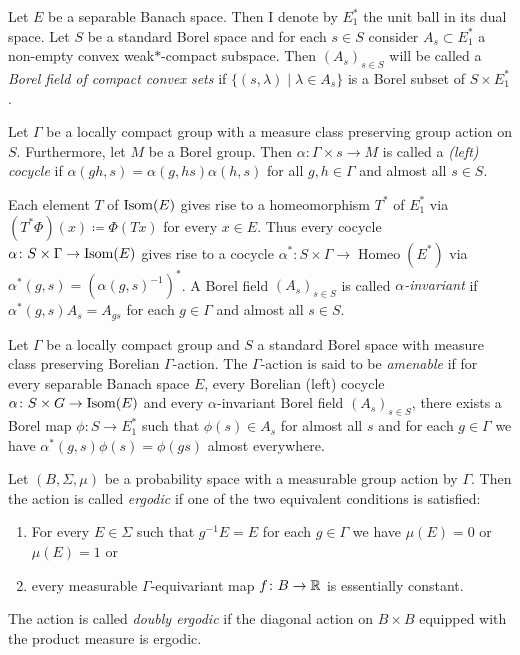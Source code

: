 \begin{defin}
  Let \(E\) be a separable Banach space. Then I denote by \(E^\ast_1\) the unit ball in its dual space. Let \(S\) be a standard Borel space and for each \(s \in S\) consider \(A_s \subset E^\ast_1\) a non-empty convex weak\(\ast\)-compact subspace. Then \((A_s)_{s \in S}\) will be called a \emph{Borel field of compact convex sets} if \(\{(s, \lambda) \mid \lambda \in A_s\}\) is a Borel subset of \(S \times E^\ast_1\).

  Let \(\Gamma\) be a locally compact group with a measure class preserving group action on \(S\). Furthermore, let \(M\) be a Borel group. Then \(\alpha \colon \Gamma \times s \to M\) is called a \emph{(left) cocycle} if \(\alpha(gh, s) = \alpha(g, hs) \alpha(h, s)\) for all \(g, h \in \Gamma\) and almost all \(s \in S\).

  Each element \(T\) of \(\operatorname{Isom}(E)\) gives rise to a homeomorphism \(T^\ast\) of \(E^\ast_1\) via \((T^\ast\Phi)(x) \coloneqq \Phi(Tx)\) for every \(x \in E\). Thus every cocycle \(\alpha \colon S \times \Gamma \to \operatorname{Isom}(E)\) gives rise to a cocycle \(\alpha^\ast \colon S \times \Gamma \to \operatorname{Homeo}(E^\ast)\) via \(\alpha^\ast (g, s) = (\alpha(g, s)^{-1})^\ast\). A Borel field \((A_s)_{s \in S}\) is called \emph{\(\alpha\)-invariant} if \(\alpha^\ast(g, s) A_{s} = A_{gs}\) for each \(g \in \Gamma\) and almost all \(s \in S\).
  
  Let \(\Gamma\) be a locally compact group and \(S\) a standard Borel space with measure class preserving Borelian \(\Gamma\)-action. The \(\Gamma\)-action is said to be \emph{amenable} if for every separable Banach space \(E\), every Borelian (left) cocycle \(\alpha \colon S \times G \to \operatorname{Isom}(E)\) and every \(\alpha\)-invariant Borel field \((A_s)_{s \in S}\), there exists a Borel map \(\phi \colon S \to E^\ast_1\) such that \(\phi(s) \in A_s\) for almost all \(s\) and for each \(g \in \Gamma\) we have \(\alpha^\ast(g, s) \phi(s) = \phi(gs)\) almost everywhere.
\end{defin}

\begin{defin}
  Let \((B, \Sigma, \mu)\) be a probability space with a measurable group action by \(\Gamma\). Then the action is called \emph{ergodic} if one of the two equivalent conditions is satisfied:
  \begin{enumerate}
  \item For every \(E \in \Sigma\) such that \(g^{-1}E = E\) for each \(g \in \Gamma\) we have \(\mu(E) = 0\) or \(\mu(E) = 1\) or
  \item every measurable \(\Gamma\)-equivariant map \(f\colon B \to \mathbb{R}\) is essentially constant.
  \end{enumerate}
  The action is called \emph{doubly ergodic} if the diagonal action on \(B \times B\) equipped with the product measure is ergodic.
\end{defin}

